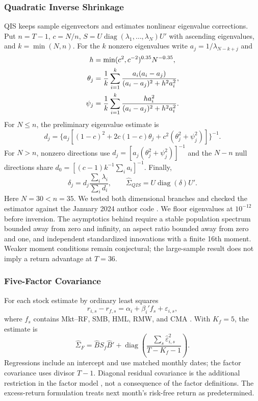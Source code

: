 \documentclass[letterpaper,journal]{IEEEtran}
\begin{document}
\subsubsection{Quadratic Inverse Shrinkage}
QIS \cite{qis} keeps sample eigenvectors and estimates nonlinear eigenvalue corrections. Put $n=T-1$, $c=N/n$, $S=U\operatorname{diag}(\lambda_1,\ldots,\lambda_N)U'$ with ascending eigenvalues, and $k=\min(N,n)$. For the $k$ nonzero eigenvalues write $a_j=1/\lambda_{N-k+j}$ and
\begin{align}
 h&=\min(c^2,c^{-2})^{0.35}N^{-0.35},\notag\\
 \theta_j&=\frac1k\sum_{i=1}^k
 \frac{a_i(a_i-a_j)}{(a_i-a_j)^2+h^2a_i^2},\\
 \psi_j&=\frac1k\sum_{i=1}^k
 \frac{ha_i^2}{(a_i-a_j)^2+h^2a_i^2}.\notag
\end{align}
For $N\leq n$, the preliminary eigenvalue estimate is
\begin{equation}
 d_j=\{a_j[(1-c)^2+2c(1-c)\theta_j+c^2(\theta_j^2+\psi_j^2)]\}^{-1}.
\end{equation}
For $N>n$, nonzero directions use $d_j=[a_j(\theta_j^2+\psi_j^2)]^{-1}$ and the $N-n$ null directions share $d_0=[(c-1)k^{-1}\sum_i a_i]^{-1}$. Finally,
\begin{equation}
 \delta_j=d_j\frac{\sum_i\lambda_i}{\sum_i d_i},\qquad
 \widehat\Sigma_{QIS}=U\operatorname{diag}(\delta)U'.
\end{equation}
Here $N=30<n=35$. We tested both dimensional branches and checked the estimator against the January 2024 author code \cite{lwcode}. We floor eigenvalues at $10^{-12}$ before inversion. The asymptotics behind \cite[eqs.~(4.12)--(4.15), (6.3)]{qis} require a stable population spectrum bounded away from zero and infinity, an aspect ratio bounded away from zero and one, and independent standardized innovations with a finite 16th moment. Weaker moment conditions remain conjectural; the large-sample result does not imply a return advantage at $T=36$.

\subsubsection{Five-Factor Covariance}
For each stock estimate by ordinary least squares
\begin{equation}
 r_{i,s}-r_{f,s}=\alpha_i+\beta_i'f_s+\varepsilon_{i,s},
\end{equation}
where $f_s$ contains Mkt--RF, SMB, HML, RMW, and CMA \cite{ff5}. With $K_f=5$, the estimate is
\begin{equation}
 \widehat\Sigma_F=\widehat B S_f\widehat B'
 +\operatorname{diag}\left(\frac{\sum_s\widehat\varepsilon_{i,s}^2}{T-K_f-1}\right).
\end{equation}
Regressions include an intercept and use matched monthly dates; the factor covariance uses divisor $T-1$. Diagonal residual covariance is the additional restriction in the factor model \cite{sharpe}, not a consequence of the factor definitions. The excess-return formulation treats next month's risk-free return as predetermined.
\end{document}
